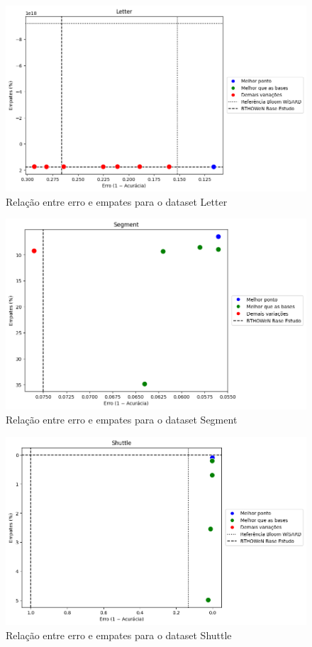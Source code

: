 \documentclass{article}
\begin{document}
\begin{figure}[H]
\centering
\includegraphics[width=1.1\textwidth]{figures/image12.png}
\caption{Relação entre erro e empates para o dataset Letter}
\label{fig:letter}
\end{figure}

\begin{figure}[H]
\centering
\includegraphics[width=1.1\textwidth]{figures/image2.png}
\caption{Relação entre erro e empates para o dataset Segment}
\label{fig:segment}
\end{figure}

\begin{figure}[H]
\centering
\includegraphics[width=1.1\textwidth]{figures/image9.png}
\caption{Relação entre erro e empates para o dataset Shuttle}
\label{fig:shuttle}
\end{figure}
\end{document}
